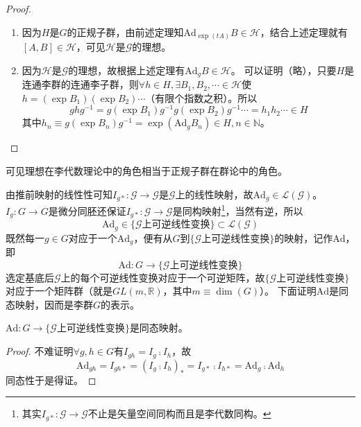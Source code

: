 \begin{proof}
    \begin{enumerate}[（A）]
        \item 因为$H$是$G$的正规子群，由前述定理知$\mathrm{Ad}_{\exp(tA)}B \in \mathscr{H}$，结合上述定理就有$[A, B] \in \mathscr{H}$，可见$\mathscr{H}$是$\mathscr{G}$的理想。
        \item 因为$\mathscr{H}$是$\mathscr{G}$的理想，故根据上述定理有$\mathrm{Ad}_gB \in \mathscr{H}$。
        可以证明（略），只要$H$是连通李群的连通李子群，则$\forall h \in H, \exists B_1, B_2, \cdots \in \mathscr{H}$使$h=(\exp B_1)(\exp B_2)\cdots$（有限个指数之积）。所以
        $$ghg^{-1} = g(\exp B_1)g^{-1}g(\exp B_2)g^{-1}\cdots = h_1h_2\cdots\in H$$
        其中$h_n \equiv g(\exp B_n)g^{-1} = \exp(\mathrm{Ad}_gB_n) \in H, n \in \mathbb{N}$。
    \end{enumerate}
\end{proof}

\begin{note}
    可见理想在李代数理论中的角色相当于正规子群在群论中的角色。
\end{note}

由推前映射的线性性可知$I_{g*} \colon \mathscr{G} \to \mathscr{G}$是$\mathscr{G}$上的线性映射，故$\mathrm{Ad}_g \in \mathscr{L}(\mathscr{G})$。
$I_g \colon G \to G$是微分同胚还保证$I_{g*} \colon \mathscr{G} \to \mathscr{G}$是同构映射\footnote{
    其实$I_{g*} \colon \mathscr{G} \to \mathscr{G}$不止是矢量空间同构而且是李代数同构。
}，当然有逆，所以
$$\mathrm{Ad}_g \in \{\mathscr{G}\text{上可逆线性变换}\} \subset \mathscr{L}(\mathscr{G})$$
既然每一$g \in G$对应于一个$\mathrm{Ad}_g$，便有从$G$到$\{\mathscr{G}\text{上可逆线性变换}\}$的映射，记作$\mathrm{Ad}$，即
$$\mathrm{Ad} \colon G \to \{\mathscr{G}\text{上可逆线性变换}\}$$
选定基底后$\mathscr{G}$上的每个可逆线性变换对应于一个可逆矩阵，故$\{\mathscr{G}\text{上可逆线性变换}\}$对应于一个矩阵群（就是$GL(m, \mathbb{R})$，其中$m \equiv \dim(G)$）。
下面证明$\mathrm{Ad}$是同态映射，因而是李群$G$的表示。

\begin{theorem}
    $\mathrm{Ad} \colon G \to \{\mathscr{G}\text{上可逆线性变换}\}$是同态映射。
\end{theorem}

\begin{proof}
    不难证明$\forall g, h \in G$有$I_{gh} = I_g \comp I_h$，故
    $$\mathrm{Ad}_{gh} = I_{gh*} = (I_g \comp I_h)_* = I_{g*} \comp I_{h*} = \mathrm{Ad}_g \comp \mathrm{Ad}_h$$
    同态性于是得证。
\end{proof}


